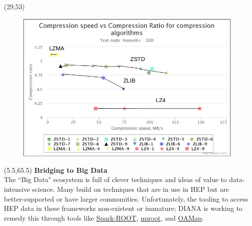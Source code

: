 \documentclass[final]{beamer}
\begin{document}
\begin{frame}{}
\begin{textblock}{12.5}(29,53)
\begin{figure}[tbph]
\centering
\includegraphics[width=\textwidth]{images/compr.png}
\end{figure}
\end{textblock}


\begin{textblock}{22.5}(5.5,65.5)
\textcolor{mybluelabel}{\bf Bridging to Big Data} \\
The ``Big Data" ecosystem is full of clever techniques and ideas of value to data-intensive science.
Many build on techniques that are in use in HEP but are better-supported or have larger communities.
Unfortunately, the tooling to access HEP data in these frameworks non-existent or immature;
DIANA is working to remedy this through tools like \href{https://github.com/diana-hep/spark-root}{Spark-ROOT}, \href{https://github.com/scikit-hep/uproot}{uproot}, and \href{https://github.com/diana-hep/oamap}{OAMap}.
\end{textblock}


\end{frame}
\end{document}
